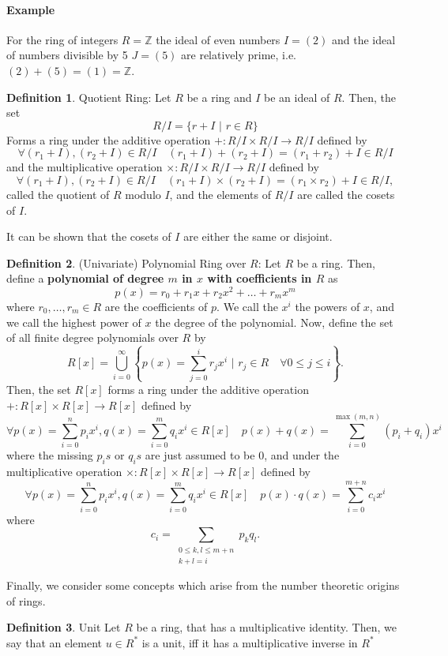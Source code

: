 \documentclass{article}
\theoremstyle{definition}
\newtheorem{definition}{Definition}[section]
\theoremstyle{example}
\newcommand{\Int}{\mathbb{Z}}
\begin{document}
\paragraph{Example} For the ring of integers $R = \Int$ the ideal of even numbers
$I = (2)$ and the ideal of numbers divisible by 5 $J = (5)$ are relatively
prime, i.e. $(2) + (5) = (1) = \Int$.
\begin{definition}{Quotient Ring:}
  Let $R$ be a ring and $I$ be an ideal of $R$. Then, the set
  \[
    R/I = \{r + I\,\,|\,\, r \in R\}
  \]
  Forms a ring under the additive operation $+: R/I\times R/I \to R/I$ defined by
  \[
    \forall (r_1 + I), (r_2 + I) \in R/I\quad (r_1 + I) + (r_2 + I) = (r_1 +
    r_2) + I \in R/I
  \]
  and the multiplicative operation $\times: R/I\times R/I \to R/I$ defined by
  \[
    \forall (r_1 + I), (r_2 + I) \in R/I\quad (r_1 + I) \times (r_2 + I) = (r_1 \times
    r_2) + I \in R/I,
  \]
  called the quotient of $R$ modulo $I$, and the elements of $R/I$ are called
  the cosets of $I$.
\end{definition}
It can be shown that the cosets of $I$ are either the same or disjoint.
\begin{definition}{(Univariate) Polynomial Ring over $R$:}
  Let $R$ be a ring. Then, define a \textbf{polynomial of degree $m$ in $x$ with
  coefficients in $R$} as
\[
  p(x) = r_0 + r_1x + r_2x^2 + \hdots + r_mx^m
\]
where $r_0,\hdots, r_m \in R$ are the coefficients of $p$. We call the $x^i$
the powers of $x$, and we call the highest power of $x$ the degree of the
polynomial. Now, define the set of all finite degree polynomials over $R$ by
\[
  R[x] = \bigcup_{i = 0}^\infty \left\{p(x) = \sum_{j = 0}^i r_jx^i\,\,|\,\,r_j \in R\quad
  \forall 0 \leq j \leq i\right\}.
\]
Then, the set $R[x]$ forms a ring under the additive operation $+: R[x]\times
R[x] \to R[x]$ defined by
\[
  \forall p(x) = \sum_{i = 0}^n p_ix^i, q(x) = \sum_{i = 0}^m q_ix^i \in
  R[x]\quad p(x) + q(x) = \sum_{i = 0}^{\max(m, n)} (p_i + q_i)x^i
\]
where the missing $p_is$ or $q_is$ are just assumed to be $0$, and under the
multiplicative operation $\times: R[x]\times
R[x] \to R[x]$ defined by
\[
  \forall p(x) = \sum_{i = 0}^n p_ix^i, q(x) = \sum_{i = 0}^m q_ix^i \in
  R[x]\quad p(x) \cdot q(x) = \sum_{i = 0}^{m + n} c_ix^i
\]
where
\[
  c_i = \sum_{\substack{0 \leq k, l \leq m + n \\ k + l = i}} p_kq_l.
\]
\end{definition}
Finally, we consider some concepts which arise from the number theoretic origins
of rings.
\begin{definition}{Unit}
  Let $R$ be a ring, that has a multiplicative identity. Then, we say that an
  element $u \in R^*$ is a unit, iff it has a multiplicative inverse in $R^*$
\end{definition}
\end{document}
